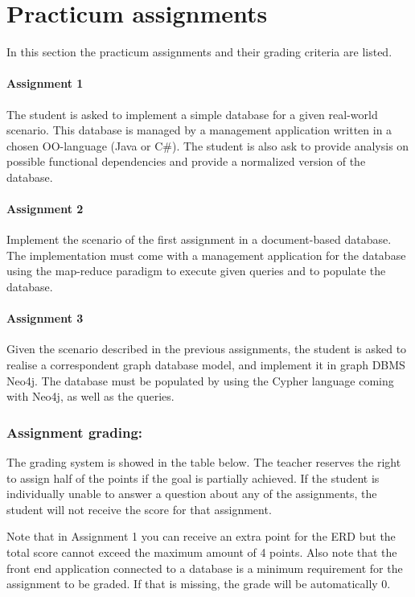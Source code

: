 \section{Practicum assignments}
	In this section the practicum assignments and their grading criteria are listed.
	
	\paragraph*{Assignment 1}
		The student is asked to implement a simple database for a given real-world scenario. This database is managed by a management application written in a chosen OO-language (Java or C\#). The student is also ask to provide analysis on possible functional dependencies and provide a normalized version of the database.

	\paragraph*{Assignment 2}
		Implement the scenario of the first assignment in a document-based database. The implementation must come with a management application for the database using the map-reduce paradigm to execute given queries and to populate the database.

	\paragraph*{Assignment 3}
		Given the scenario described in the previous assignments, the student is asked to realise a correspondent graph database model, and implement it in graph DBMS Neo4j. The database must be populated by using the Cypher language coming with Neo4j, as well as the queries.
		
		\subsubsection*{Assignment grading:}
		The grading system is showed in the table below. The teacher reserves the right to assign half of the points if the goal is partially achieved. If the student is individually unable to answer a question about any of the assignments, the student will not receive the score for that assignment.
		
		Note that in Assignment 1 you can receive an extra point for the ERD but the total score cannot exceed the maximum amount of 4 points. Also note that the front end application connected to a database is a minimum requirement for the assignment to be graded. If that is missing, the grade will be automatically 0.
		
